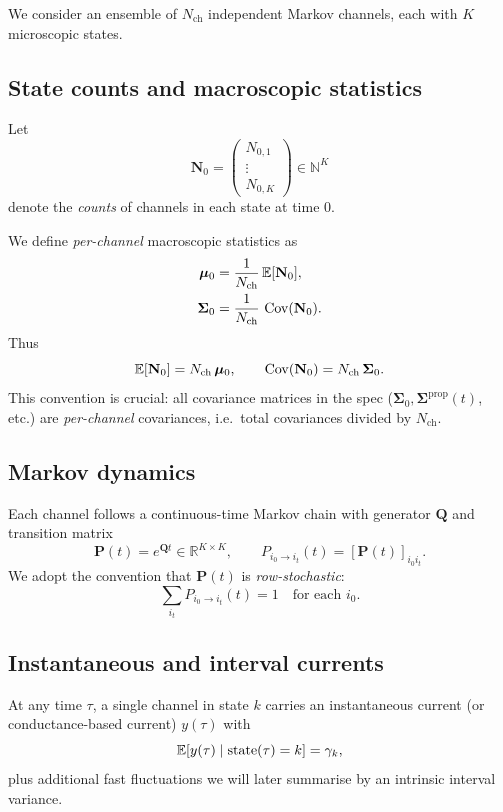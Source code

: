 \documentclass[11pt]{article}
\begin{document}
We consider an ensemble of \(N_{\text{ch}}\) independent Markov channels, each
with \(K\) microscopic states.

\subsection{State counts and macroscopic statistics}

Let
\[
  \mathbf{N}_0
  =
  \begin{pmatrix}
    N_{0,1}\\ \vdots \\ N_{0,K}
  \end{pmatrix}
  \in \mathbb{N}^K
\]
denote the \emph{counts} of channels in each state at time \(0\).

We define \emph{per-channel} macroscopic statistics as
\begin{align}
  \boldsymbol{\mu}_0
  &= \frac{1}{N_{\text{ch}}}\,\mathbb{E}[\mathbf{N}_0],
  \label{eq:mu0-def}
  \\
  \boldsymbol{\Sigma}_0
  &= \frac{1}{N_{\text{ch}}}\,
     \operatorname{Cov}(\mathbf{N}_0).
  \label{eq:Sigma0-def}
\end{align}
Thus
\[
  \mathbb{E}[\mathbf{N}_0] = N_{\text{ch}}\,\boldsymbol{\mu}_0,
  \qquad
  \operatorname{Cov}(\mathbf{N}_0) = N_{\text{ch}}\,\boldsymbol{\Sigma}_0.
\]
This convention is crucial: all covariance matrices in the spec
(\(\boldsymbol{\Sigma}_0,\boldsymbol{\Sigma}^{\text{prop}}(t)\), etc.) are
\emph{per-channel} covariances, i.e.\ total covariances divided by
\(N_{\text{ch}}\).

\subsection{Markov dynamics}

Each channel follows a continuous-time Markov chain with generator \(\mathbf{Q}\)
and transition matrix
\[
  \mathbf{P}(t) = e^{\mathbf{Q}t}
  \in \mathbb{R}^{K\times K},
  \qquad
  P_{i_0\to i_t}(t) = [\mathbf{P}(t)]_{i_0 i_t}.
\]
We adopt the convention that \(\mathbf{P}(t)\) is \emph{row-stochastic}:
\[
  \sum_{i_t} P_{i_0\to i_t}(t) = 1 \quad\text{for each } i_0.
\]

\subsection{Instantaneous and interval currents}

At any time \(\tau\), a single channel in state \(k\) carries an instantaneous
current (or conductance-based current) \(y(\tau)\) with
\[
  \mathbb{E}[y(\tau)\mid \text{state}(\tau)=k] = \gamma_k,
\]
plus additional fast fluctuations we will later summarise by an intrinsic
interval variance.
\end{document}
